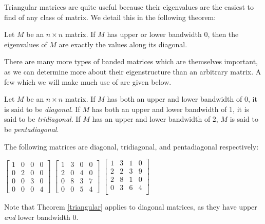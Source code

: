 \documentclass[10pt,twocolumn]{article}
\begin{document}
Triangular matrices are quite useful because their eigenvalues are the easiest to find of any class of matrix. We detail this in the following theorem\cite{Kuttler_2021}:

\begin{thm}\label{triangular}
    Let $M$ be an $n \times n$ matrix. If $M$ has upper or lower bandwidth $0$, then the eigenvalues of $M$ are exactly the values along its diagonal.
\end{thm}

There are many more types of banded matrices which are themselves important, as we can determine more about their eigenstructure than an arbitrary matrix. A few which we will make much use of are given below. 

\begin{definition}
    Let $M$ be an $n\times n$ matrix. If $M$ has both an upper and lower bandwidth of $0$, it is said to be \textit{diagonal}. If $M$ has both an upper and lower bandwidth of $1$, it is said to be \textit{tridiagonal}. If $M$ has an upper and lower bandwidth of $2$, $M$ is said to be \textit{pentadiagonal}. 
\end{definition} 

\begin{example} The following matrices are diagonal, tridiagonal, and pentadiagonal respectively:

\vspace{0.2cm}
\centering
    $ \begin{bmatrix}
1 & 0 & 0 & 0 \\
0 & 2 & 0 & 0 \\
0 & 0 & 3 & 0 \\
0 & 0 & 0 & 4
\end{bmatrix}  $
$ \begin{bmatrix}
1 & 3 & 0 & 0 \\
2 & 0 & 4 & 0 \\
0 & 8 & 3 & 7 \\
0 & 0 & 5 & 4 
\end{bmatrix}  $
$ \begin{bmatrix}
1 & 3 & 1 & 0 \\
2 & 2 & 3 & 9 \\
2 & 8 & 1 & 0 \\
0 & 3 & 6 & 4 \\ 
\end{bmatrix}  $
\end{example}

Note that Theorem \ref{triangular} applies to diagonal matrices, as they have upper \textit{and} lower bandwidth 0.
\end{document}
